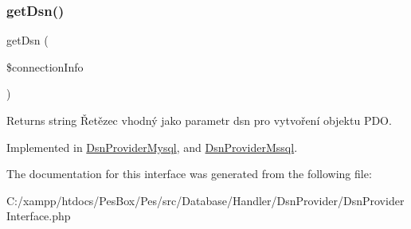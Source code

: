 \subsubsection{\texorpdfstring{get\+Dsn()}{getDsn()}}
{\footnotesize\ttfamily get\+Dsn (\begin{DoxyParamCaption}\item[{\mbox{\hyperlink{interface_pes_1_1_database_1_1_handler_1_1_connection_info_interface}{Connection\+Info\+Interface}}}]{\$connection\+Info }\end{DoxyParamCaption})}

\begin{DoxyReturn}{Returns}
string Řetězec vhodný jako parametr dsn pro vytvoření objektu P\+DO. 
\end{DoxyReturn}


Implemented in \mbox{\hyperlink{class_pes_1_1_database_1_1_handler_1_1_dsn_provider_1_1_dsn_provider_mysql_a7252e2f23ea50a5061fef81d06d6765a}{Dsn\+Provider\+Mysql}}, and \mbox{\hyperlink{class_pes_1_1_database_1_1_handler_1_1_dsn_provider_1_1_dsn_provider_mssql_a7252e2f23ea50a5061fef81d06d6765a}{Dsn\+Provider\+Mssql}}.



The documentation for this interface was generated from the following file\+:\begin{DoxyCompactItemize}
\item 
C\+:/xampp/htdocs/\+Pes\+Box/\+Pes/src/\+Database/\+Handler/\+Dsn\+Provider/Dsn\+Provider\+Interface.\+php\end{DoxyCompactItemize}
